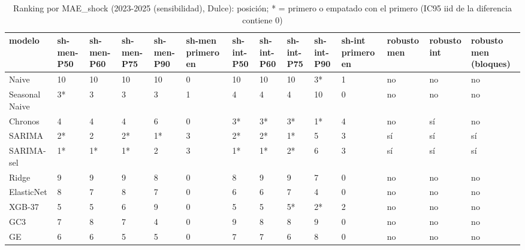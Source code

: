\begin{table}[H]
\centering
\small
\caption{Ranking por MAE\_shock (2023-2025 (sensibilidad), Dulce): posición; * = primero o empatado con el primero (IC95 iid de la diferencia contiene 0)}
\label{tab:T08_ranking_shock_sensibilidad_2023_2025_dulce}
\begin{tabular}{llllllllllllll}
\toprule
modelo & sh-men-P50 & sh-men-P60 & sh-men-P75 & sh-men-P90 & sh-men primero en & sh-int-P50 & sh-int-P60 & sh-int-P75 & sh-int-P90 & sh-int primero en & robusto men & robusto int & robusto men (bloques) \\
\midrule
Naive & 10 & 10 & 10 & 10 & 0 & 10 & 10 & 10 & 3* & 1 & no & no & no \\
Seasonal Naive & 3* & 3 & 3 & 3 & 1 & 4 & 4 & 4 & 10 & 0 & no & no & no \\
Chronos & 4 & 4 & 4 & 6 & 0 & 3* & 3* & 3* & 1* & 4 & no & sí & no \\
SARIMA & 2* & 2 & 2* & 1* & 3 & 2* & 2* & 1* & 5 & 3 & sí & sí & sí \\
SARIMA-sel & 1* & 1* & 1* & 2 & 3 & 1* & 1* & 2* & 6 & 3 & sí & sí & sí \\
Ridge & 9 & 9 & 9 & 8 & 0 & 8 & 9 & 9 & 7 & 0 & no & no & no \\
ElasticNet & 8 & 7 & 8 & 7 & 0 & 6 & 6 & 7 & 4 & 0 & no & no & no \\
XGB-37 & 5 & 5 & 6 & 9 & 0 & 5 & 5 & 5* & 2* & 2 & no & no & no \\
GC3 & 7 & 8 & 7 & 4 & 0 & 9 & 8 & 8 & 9 & 0 & no & no & no \\
GE & 6 & 6 & 5 & 5 & 0 & 7 & 7 & 6 & 8 & 0 & no & no & no \\
\bottomrule
\end{tabular}
\end{table}
